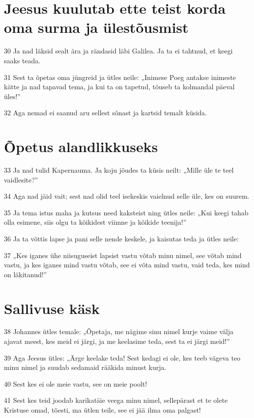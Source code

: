 \section*{Jeesus kuulutab ette teist korda oma surma ja ülestõusmist}

\par 30 Ja nad läksid sealt ära ja rändasid läbi Galilea. Ja ta ei tahtnud, et keegi saaks teada.
\par 31 Sest ta õpetas oma jüngreid ja ütles neile: „Inimese Poeg antakse inimeste kätte ja nad tapavad tema, ja kui ta on tapetud, tõuseb ta kolmandal päeval üles!”
\par 32 Aga nemad ei saanud aru sellest sõnast ja kartsid temalt küsida.

\section*{Õpetus alandlikkuseks}

\par 33 Ja nad tulid Kapernauma. Ja koju jõudes ta küsis neilt: „Mille üle te teel vaidlesite?”
\par 34 Aga nad jäid vait; sest nad olid teel isekeskis vaielnud selle üle, kes on suurem.
\par 35 Ja tema istus maha ja kutsus need kaksteist ning ütles neile: „Kui keegi tahab olla esimene, siis olgu ta kõikidest viimne ja kõikide teenija!”
\par 36 Ja ta võttis lapse ja pani selle nende keskele, ja kaisutas teda ja ütles neile:
\par 37 „Kes iganes ühe niisuguseist lapsist vastu võtab minu nimel, see võtab mind vastu, ja kes iganes mind vastu võtab, see ei võta mind vastu, vaid teda, kes mind on läkitanud!”

\section*{Sallivuse käsk}

\par 38 Johannes ütles temale: „Õpetaja, me nägime sinu nimel kurje vaime välja ajavat meest, kes meid ei järgi, ja me keelasime teda, sest ta ei järgi meid!”
\par 39 Aga Jeesus ütles: „Ärge keelake teda! Sest kedagi ei ole, kes teeb vägeva teo minu nimel ja suudab sedamaid rääkida minust kurja.
\par 40 Sest kes ei ole meie vastu, see on meie poolt!
\par 41 Sest kes teid joodab karikatäie veega minu nimel, sellepärast et te olete Kristuse omad, tõesti, ma ütlen teile, see ei jää ilma oma palgast!

